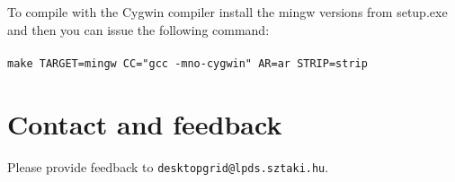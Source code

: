 \documentclass[a4paper,12pt,titlepage,dvipdfm]{article}
\begin{document}
To compile with the Cygwin compiler install the mingw versions from setup.exe                                                                                                                                                              
and then you can issue the following command:                                                                                                                                                                                              
\\
\\                                                                                                                                                                                                                                           
\texttt{make TARGET=mingw CC="gcc -mno-cygwin" AR=ar STRIP=strip}

\section{Contact and feedback}

Please provide feedback to \texttt{desktopgrid@lpds.sztaki.hu}.
\end{document}
